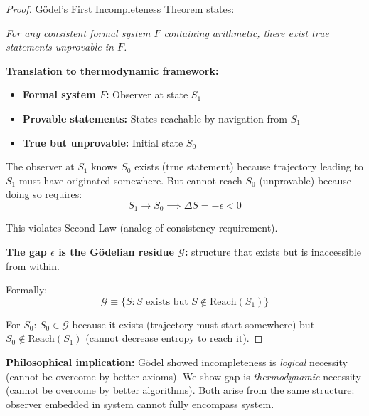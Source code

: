 \documentclass[twocolumn,10pt]{article}
\theoremstyle{definition}
\theoremstyle{remark}
\begin{document}
\begin{proof}
Gödel's First Incompleteness Theorem\cite{godel1931} states:

\textit{For any consistent formal system $F$ containing arithmetic, there exist true statements unprovable in $F$.}

\vspace{0.2cm}
\noindent\textbf{Translation to thermodynamic framework:}

\begin{itemize}
\item \textbf{Formal system $F$:} Observer at state $S_1$
\item \textbf{Provable statements:} States reachable by navigation from $S_1$
\item \textbf{True but unprovable:} Initial state $S_0$
\end{itemize}

\vspace{0.2cm}
\noindent The observer at $S_1$ knows $S_0$ exists (true statement) because trajectory leading to $S_1$ must have originated somewhere. But cannot reach $S_0$ (unprovable) because doing so requires:
\begin{equation}
S_1 \to S_0 \implies \Delta S = -\epsilon < 0
\end{equation}

This violates Second Law (analog of consistency requirement).

\vspace{0.2cm}
\noindent\textbf{The gap $\epsilon$ is the Gödelian residue $\mathcal{G}$:} structure that exists but is inaccessible from within.

Formally:
\begin{equation}
\mathcal{G} \equiv \{S : S \text{ exists but } S \not\in \text{Reach}(S_1)\}
\end{equation}

For $S_0$: $S_0 \in \mathcal{G}$ because it exists (trajectory must start somewhere) but $S_0 \not\in \text{Reach}(S_1)$ (cannot decrease entropy to reach it).
\end{proof}

\vspace{0.2cm}
\noindent\textbf{Philosophical implication:} Gödel showed incompleteness is \textit{logical} necessity (cannot be overcome by better axioms). We show gap is \textit{thermodynamic} necessity (cannot be overcome by better algorithms). Both arise from the same structure: observer embedded in system cannot fully encompass system.
\end{document}
